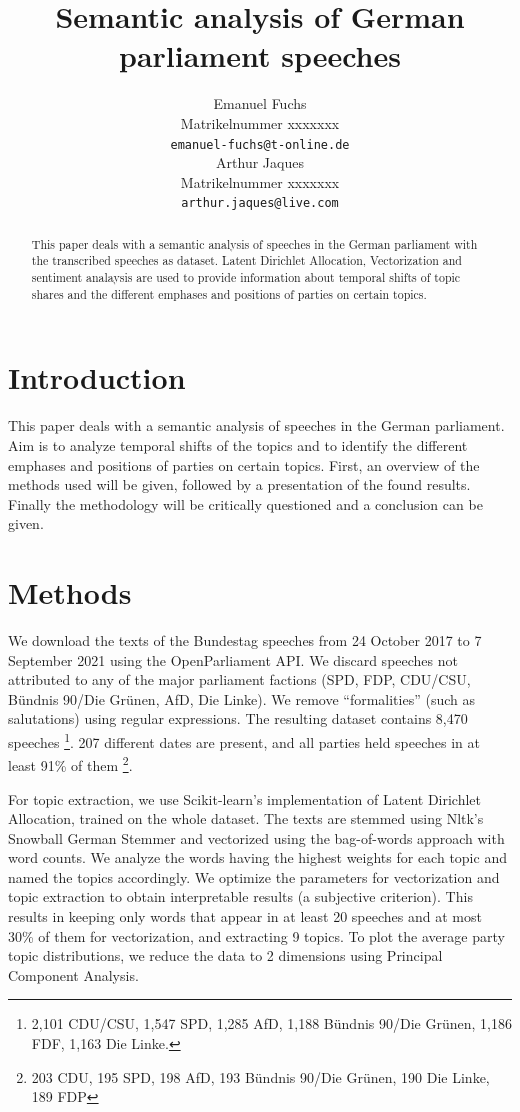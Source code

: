 \documentclass{article}
\title{Semantic analysis of German parliament speeches}
\author{%
  Emanuel Fuchs\\
  Matrikelnummer xxxxxxx\\
  \texttt{emanuel-fuchs@t-online.de} \\
  \And
  Arthur Jaques\\
  Matrikelnummer xxxxxxx\\
  \texttt{arthur.jaques@live.com} \\
}
\begin{document}
\maketitle


\begin{abstract}
  This paper deals with a semantic analysis of speeches in the German parliament with the transcribed speeches as dataset.
  Latent Dirichlet Allocation, Vectorization and sentiment analaysis are used to provide information about temporal shifts of topic shares and the different emphases and positions of parties on certain topics. 
\end{abstract}


\section{Introduction}
This paper deals with a semantic analysis of speeches in the German parliament. 
Aim is to analyze temporal shifts of the topics and to identify the different emphases and positions of parties on certain topics.
First, an overview of the methods used will be given, followed by a presentation of the found results. 
Finally the methodology will be critically questioned and a conclusion can be given.


\section{Methods}
We download the texts of the Bundestag speeches from 24 October 2017 to 7 September 2021 using the OpenParliament \cite{OpenParliamentTV} API.
We discard speeches not attributed to any of the major parliament factions (SPD, FDP, CDU/CSU, Bündnis 90/Die Grünen, AfD, Die Linke).
We remove ``formalities'' (such as salutations) using regular expressions.
The resulting dataset contains 8,470 speeches
\footnote{2,101 CDU/CSU, 1,547 SPD, 1,285 AfD, 1,188 Bündnis 90/Die Grünen, 1,186 FDF, 1,163 Die Linke.}.
207 different dates are present, and all parties held speeches in at least 91\% of them
\footnote{203 CDU, 195 SPD, 198 AfD, 193 Bündnis 90/Die Grünen, 190 Die Linke, 189 FDP}.

For topic extraction, we use Scikit-learn's \cite{Scikit-learn} implementation of Latent Dirichlet Allocation, trained on the whole dataset.
The texts are stemmed using Nltk's \cite{Nltk} Snowball German Stemmer and vectorized using the bag-of-words approach with word counts.
We analyze the words having the highest weights for each topic and named the topics accordingly.
We optimize the parameters for vectorization and topic extraction to obtain interpretable results (a subjective criterion).
This results in keeping only words that appear in at least 20 speeches and at most 30\% of them for vectorization, and extracting 9 topics.
To plot the average party topic distributions, we reduce the data to 2 dimensions using Principal Component Analysis.
\end{document}
